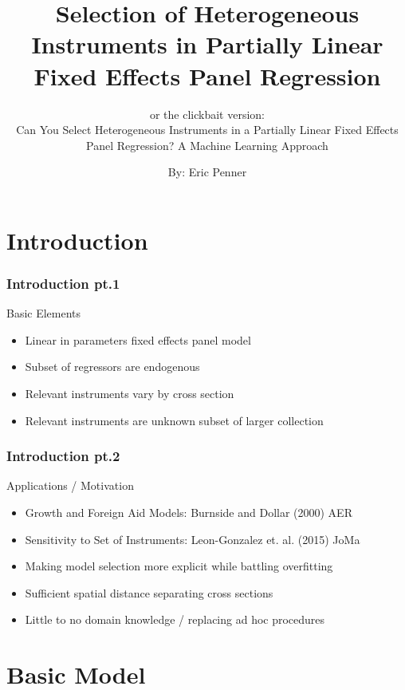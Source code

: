 \documentclass[9pt]{beamer}
\title{Selection of Heterogeneous Instruments in Partially Linear Fixed Effects Panel Regression }
\subtitle{ or the clickbait version: \\ Can You Select Heterogeneous Instruments in a Partially Linear Fixed Effects Panel Regression? A Machine Learning Approach  }
\author{By: Eric Penner}
\begin{document}
\frame{\titlepage}

\section{Introduction}
\begin{frame} 
\frametitle{Introduction pt.1} 

Basic Elements
\begin{itemize} \addtolength{\itemsep}{\baselineskip}
    \item Linear in parameters fixed effects panel model
    \item Subset of regressors are endogenous
    \item Relevant instruments vary by cross section
    \item Relevant instruments are unknown subset of larger collection
\end{itemize}
 
\end{frame}
\begin{frame} 
\frametitle{Introduction pt.2} 


Applications / Motivation
\begin{itemize}\addtolength{\itemsep}{\baselineskip}
    \item Growth and Foreign Aid Models: Burnside and Dollar (2000) AER  
    \item Sensitivity to Set of Instruments:    Leon-Gonzalez et. al. (2015) JoMa
    \item Making model selection more explicit while battling overfitting
    \item Sufficient spatial distance separating cross sections 
    \item Little to no domain knowledge / replacing ad hoc procedures
\end{itemize}


\end{frame}

\section{Basic Model} 
\end{document}
